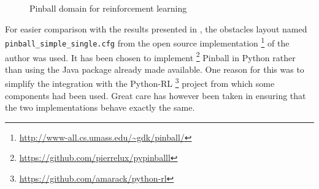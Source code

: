 \documentclass[12pt, oneside, extrafontsizes]{memoir}  %
\theoremstyle{plain}
\theoremstyle{definition}
\begin{document}
\begin{figure}
\centering
{}%
%
\caption{Pinball domain for reinforcement learning}
\end{figure}

For easier comparison with the results presented in \cite{Konidaris2009}, the obstacles layout named \texttt{pinball\_simple\_single.cfg} from the open source implementation \footnote{\url{http://www-all.cs.umass.edu/~gdk/pinball/}} of the author was used. It has been chosen to implement \footnote{\url{https://github.com/pierrelux/pypinballl}} Pinball in Python rather than using the Java package already made available. One reason for this was to simplify the integration with the Python-RL \footnote{\url{https://github.com/amarack/python-rl}} project from which some components had been used. Great care has however been taken in ensuring that the two implementations behave exactly the same. 
\end{document}
